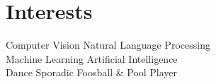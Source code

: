 \documentclass[a4paper]{norm-resume}
\begin{document}
\vspace{2mm}
\section{Interests}

\vspace{1mm} %

	{\large{
	{Computer Vision \hfill Natural Language Processing \\
	Machine Learning \hfill Artificial Intelligence\\
	Dance \hfill Sporadic Foosball \& Pool Player\\}		
	}}
	
\end{document}
